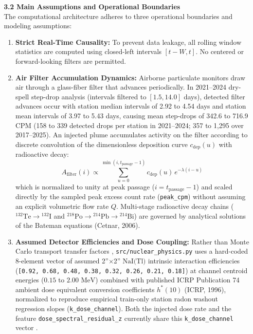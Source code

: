 \documentclass[11pt,a4paper]{article}
\begin{document}
\begin{framed}
\vspace{0.6em}
\noindent\textbf{3.2 Main Assumptions and Operational Boundaries}\\[0.3em]
The computational architecture adheres to three operational boundaries and modeling assumptions:
\begin{enumerate}
    \item \textbf{Strict Real-Time Causality:} To prevent data leakage, all rolling window statistics are computed using closed-left intervals $[t-W, t]$. No centered or forward-looking filters are permitted.
    \item \textbf{Air Filter Accumulation Dynamics:} Airborne particulate monitors draw air through a glass-fiber filter that advances periodically. In 2021--2024 dry-spell step-drop analysis (intervals filtered to $[1.5, 14.0]$ days), detected filter advances occur with station median intervals of 2.92 to 4.54 days and station mean intervals of 3.97 to 5.43 days, causing mean step-drops of 342.6 to 716.9 CPM (158 to 339 detected drops per station in 2021--2024; 357 to 1,295 over 2017--2025). An injected plume accumulates activity on the filter according to discrete convolution of the dimensionless deposition curve $c_{\text{dep}}(u)$ with radioactive decay:
    \begin{equation}
        A_{\text{filter}}(i) \propto \sum_{u=0}^{\min(i, t_{\text{passage}}-1)} c_{\text{dep}}(u) \, e^{-\lambda(i-u)}
    \end{equation}
    which is normalized to unity at peak passage ($i = t_{\text{passage}}-1$) and scaled directly by the sampled peak excess count rate (\texttt{peak\_cpm}) without assuming an explicit volumetric flow rate $Q$. Multi-stage radioactive decay chains ($^{132}\text{Te} \to {}^{132}\text{I}$ and $^{218}\text{Po} \to {}^{214}\text{Pb} \to {}^{214}\text{Bi}$) are governed by analytical solutions of the Bateman equations (Cetnar, 2006).
    \item \textbf{Assumed Detector Efficiencies and Dose Coupling:} Rather than Monte Carlo transport transfer factors , \texttt{src/nuclear\_physics.py} uses a hard-coded 8-element vector of assumed 2''$\times$2'' $\text{NaI(Tl)}$ intrinsic interaction efficiencies (\texttt{[0.92, 0.68, 0.48, 0.38, 0.32, 0.26, 0.21, 0.18]}) at channel centroid energies ($0.15$ to $2.00\text{ MeV}$) combined with published ICRP Publication 74 ambient dose equivalent conversion coefficients $h^*(10)$ (ICRP, 1996), normalized to reproduce empirical train-only station radon washout regression slopes (\texttt{k\_dose\_channel}). Both the injected dose rate and the feature \texttt{dose\_spectral\_residual\_z} currently share this \texttt{k\_dose\_channel} vector .
\end{enumerate}


\end{framed}
\end{document}
